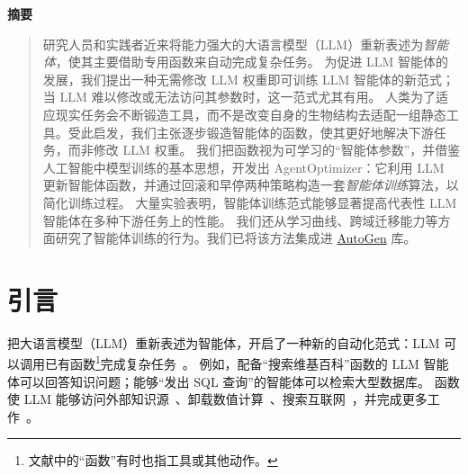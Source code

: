 \documentclass{article}
\renewenvironment{abstract}
  {\centerline{\large\bfseries 摘要}\vspace{-0.12in}\begin{quote}}
  {\par\end{quote}\vskip 0.12in}
\begin{document}


\begin{abstract}
研究人员和实践者近来将能力强大的大语言模型（LLM）重新表述为\emph{智能体}，使其主要借助专用函数来自动完成复杂任务。
为促进 LLM 智能体的发展，我们提出一种无需修改 LLM 权重即可训练 LLM 智能体的新范式；当 LLM 难以修改或无法访问其参数时，这一范式尤其有用。
人类为了适应现实任务会不断锻造工具，而不是改变自身的生物结构去适配一组静态工具。受此启发，我们主张逐步锻造智能体的函数，使其更好地解决下游任务，而非修改 LLM 权重。
我们把函数视为可学习的“智能体参数”，并借鉴人工智能中模型训练的基本思想，开发出 AgentOptimizer：它利用 LLM 更新智能体函数，并通过回滚和早停两种策略构造一套\emph{智能体训练}算法，以简化训练过程。
大量实验表明，智能体训练范式能够显著提高代表性 LLM 智能体在多种下游任务上的性能。
我们还从学习曲线、跨域迁移能力等方面研究了智能体训练的行为。我们已将该方法集成进 \href{https://github.com/microsoft/autogen/blob/main/notebook/agentchat_agentoptimizer.ipynb}{AutoGen} 库。
\end{abstract}

\section{引言}
\label{intro}

把大语言模型（LLM）重新表述为智能体，开启了一种新的自动化范式：LLM 可以调用已有函数\footnote{文献中的“函数”有时也指工具或其他动作。}完成复杂任务~\cite{xi2023rise,wang2023survey,yao2022react,wang2023voyager,humphreys2022data,ALFWorld20}。
例如，配备“搜索维基百科”函数的 LLM 智能体可以回答知识问题；能够“发出 SQL 查询”的智能体可以检索大型数据库。
函数使 LLM 能够访问外部知识源~\cite{peng2023check}、卸载数值计算~\cite{wu2023empirical}、搜索互联网~\cite{shi2017world}，并完成更多工作~\cite{qin2023tool}。
\end{document}
